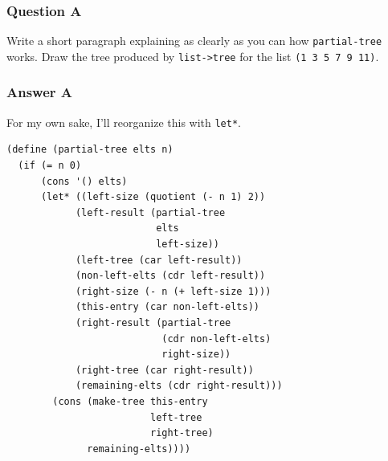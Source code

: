 \documentclass[final,fleqn,titlepage,twoside]{article}
\begin{document}
\subsubsection{Question A}
\label{sec:org879c78d}
Write a short paragraph explaining as clearly as you can how
\texttt{partial-tree} works. Draw the tree produced by \texttt{list->tree}
for the list \texttt{(1 3 5 7 9 11)}.

\subsubsection{Answer A}
\label{sec:org27d34e8}
For my own sake, I'll reorganize this with \texttt{let*}.

\begin{verbatim}
(define (partial-tree elts n)
  (if (= n 0)
      (cons '() elts)
      (let* ((left-size (quotient (- n 1) 2))
            (left-result (partial-tree
                          elts
                          left-size))
            (left-tree (car left-result))
            (non-left-elts (cdr left-result))
            (right-size (- n (+ left-size 1)))
            (this-entry (car non-left-elts))
            (right-result (partial-tree
                           (cdr non-left-elts)
                           right-size))
            (right-tree (car right-result))
            (remaining-elts (cdr right-result)))
        (cons (make-tree this-entry
                         left-tree
                         right-tree)
              remaining-elts))))

\end{verbatim}
\end{document}
